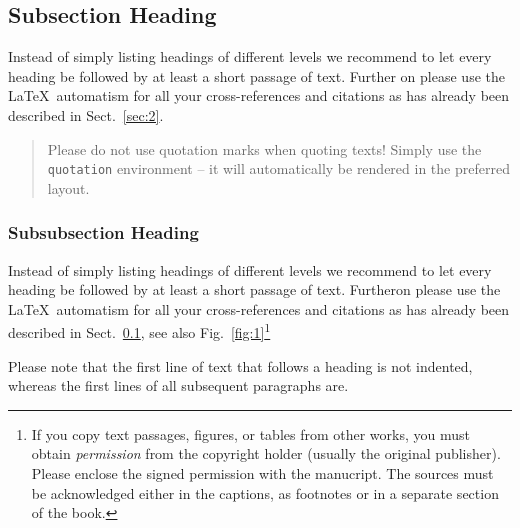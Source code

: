 \enlargethispage{24pt}

\subsection{Subsection Heading}
\label{subsec:2}
Instead of simply listing headings of different levels we recommend to let every heading be followed by at least a short passage of text. Further on please use the \LaTeX\ automatism for all your cross-references and citations as has already been described in Sect.~\ref{sec:2}.

\begin{quotation}
Please do not use quotation marks when quoting texts! Simply use the \verb|quotation| environment -- it will automatically be rendered in the preferred layout.
\end{quotation}


\subsubsection{Subsubsection Heading}
Instead of simply listing headings of different levels we recommend to let every heading be followed by at least a short passage of text. Furtheron please use the \LaTeX\ automatism for all your cross-references and citations as has already been described in Sect.~\ref{subsec:2}, see also Fig.~\ref{fig:1}\footnote{If you copy text passages, figures, or tables from other works, you must obtain \textit{permission} from the copyright holder (usually the original publisher). Please enclose the signed permission with the manucript. The sources must be acknowledged either in the captions, as footnotes or in a separate section of the book.}

Please note that the first line of text that follows a heading is not indented, whereas the first lines of all subsequent paragraphs are.

